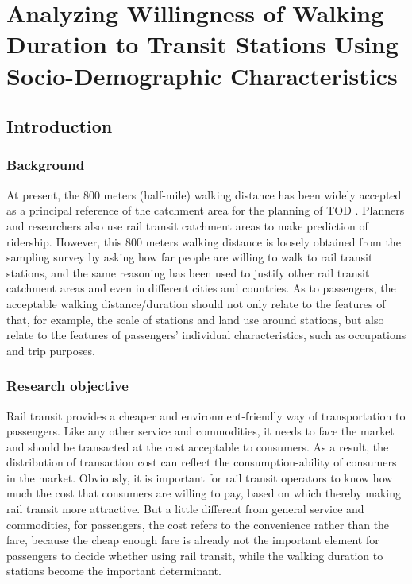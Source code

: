 \chapter{Analyzing Willingness of Walking Duration to Transit Stations Using Socio-Demographic Characteristics}

\section{Introduction}
\subsection{Background}
At present, the 800 meters (half-mile) walking distance has been widely accepted as a principal reference of the catchment area for the planning of TOD \cite{kuby2004factors,gutierrez2011transit,cardozo2012application,zhao2013influences}. Planners and researchers also use rail transit catchment areas to make prediction of ridership. However, this 800 meters walking distance is loosely obtained from the sampling survey by asking how far people are willing to walk to rail transit stations, and the same reasoning has been used to justify other rail transit catchment areas and even in different cities and countries. As to passengers, the acceptable walking distance/duration should not only relate to the features of that, for example, the scale of stations and land use around stations, but also relate to the features of passengers' individual characteristics, such as occupations and trip purposes.

%
\subsection{Research objective}
Rail transit provides a cheaper and environment-friendly way of transportation to passengers. Like any other service and commodities, it needs to face the market and should be transacted at the cost acceptable to consumers. As a result, the distribution of transaction cost can reflect the consumption-ability of consumers in the market. Obviously, it is important for rail transit operators to know how much the cost that consumers are willing to pay, based on which thereby making rail transit more attractive. But a little different from general service and commodities, for passengers, the cost refers to the convenience rather than the fare, because the cheap enough fare is already not the important element for passengers to decide whether using rail transit, while the walking duration to stations become the important determinant.

